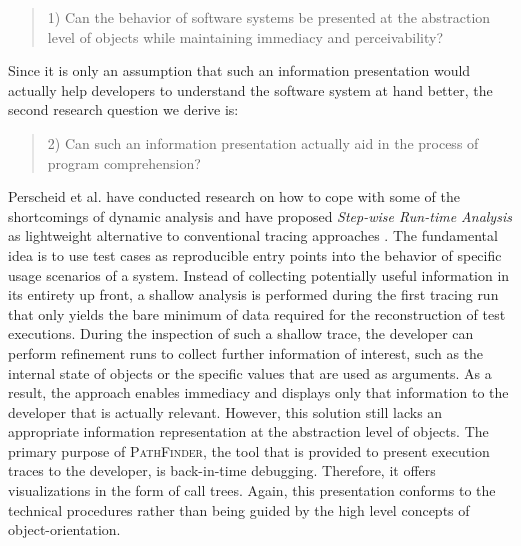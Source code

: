 \begin{quote}
1) Can the behavior of software systems be presented at the abstraction level of objects while maintaining immediacy and perceivability?
\end{quote}

Since it is only an assumption that such an information presentation would actually help developers to understand the software system at hand better, the second research question we derive is:

\begin{quote}
2) Can such an information presentation actually aid in the process of program comprehension?
\end{quote}

Perscheid et al. have conducted research on how to cope with some of the shortcomings of dynamic analysis and have proposed \emph{Step-wise Run-time Analysis} as lightweight alternative to conventional tracing approaches \cite{perscheid_immediacy_2010}.
The fundamental idea is to use test cases as reproducible entry points into the behavior of specific usage scenarios of a system.
Instead of collecting potentially useful information in its entirety up front, a shallow analysis is performed during the first tracing run that only yields the bare minimum of data required for the reconstruction of test executions.
During the inspection of such a shallow trace, the developer can perform refinement runs to collect further information of interest, such as the internal state of objects or the specific values that are used as arguments.
As a result, the approach enables immediacy and displays only that information to the developer that is actually relevant.
However, this solution still lacks an appropriate information representation at the abstraction level of objects.
The primary purpose of \textsc{PathFinder}, the tool that is provided to present execution traces to the developer, is back-in-time debugging.
Therefore, it offers visualizations in the form of call trees.
Again, this presentation conforms to the technical procedures rather than being guided by the high level concepts of object-orientation.

